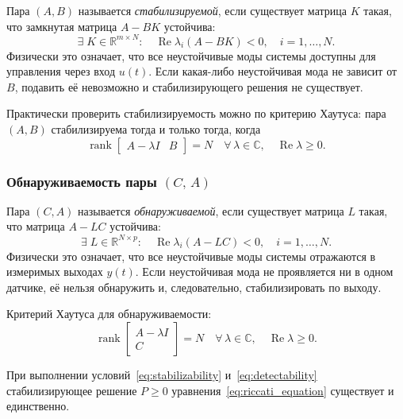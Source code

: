 \documentclass[12pt, a4paper, oneside]{extarticle}
\begin{document}
Пара $(A, B)$ называется \textit{стабилизируемой}, если существует матрица $K$
такая, что замкнутая матрица $A - BK$ устойчива:
\begin{equation}
    \exists\;K\in\mathbb{R}^{m\times N}\colon\quad
    \operatorname{Re}\lambda_i(A - BK) < 0,\quad i = 1,\dots,N.
    \label{eq:stabilizability}
\end{equation}
Физически это означает, что все неустойчивые моды системы доступны для
управления через вход $u(t)$. Если какая-либо неустойчивая мода не зависит от
$B$, подавить её невозможно и стабилизирующего решения не существует.

Практически проверить стабилизируемость можно по критерию Хаутуса: пара
$(A, B)$ стабилизируема тогда и только тогда, когда
\begin{equation}
    \operatorname{rank}\begin{bmatrix} A - \lambda I & B \end{bmatrix} = N
    \quad\forall\,\lambda\in\mathbb{C},\quad\operatorname{Re}\lambda \geq 0.
    \label{eq:hautus_stab}
\end{equation}

\subsubsection{Обнаруживаемость пары $(C,\,A)$}

Пара $(C, A)$ называется \textit{обнаруживаемой}, если существует матрица $L$
такая, что матрица $A - LC$ устойчива:
\begin{equation}
    \exists\;L\in\mathbb{R}^{N\times p}\colon\quad
    \operatorname{Re}\lambda_i(A - LC) < 0,\quad i = 1,\dots,N.
    \label{eq:detectability}
\end{equation}
Физически это означает, что все неустойчивые моды системы отражаются в
измеримых выходах $y(t)$. Если неустойчивая мода не проявляется ни в одном
датчике, её нельзя обнаружить и, следовательно, стабилизировать по выходу.

Критерий Хаутуса для обнаруживаемости:
\begin{equation}
    \operatorname{rank}\begin{bmatrix} A - \lambda I \\ C \end{bmatrix} = N
    \quad\forall\,\lambda\in\mathbb{C},\quad\operatorname{Re}\lambda \geq 0.
    \label{eq:hautus_det}
\end{equation}

При выполнении условий~\eqref{eq:stabilizability} и~\eqref{eq:detectability}
стабилизирующее решение $P \geq 0$ уравнения~\eqref{eq:riccati_equation}
существует и единственно.
\end{document}
